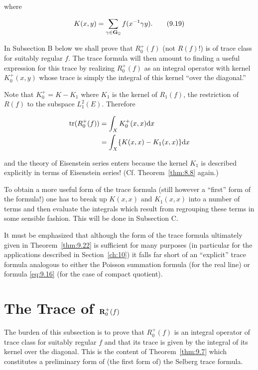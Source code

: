 where

\begin{equation}\label{eq:9.19}
K(x, y) = \sum_{\gamma \in \mathbf{G}_{\mathbb{Q}}} f(x^{-1}\gamma y).\tag{9.19}
\end{equation}

In Subsection B below we shall prove that $R_0^{+}(f)$ (not $R(f)!$) is of trace class for suitably regular $f$. The trace formula will then amount to finding a useful expression for this trace by realizing $R_0^{+}(f)$ as an integral operator with kernel $K_0^{+}(x,y)$ whose trace is simply the integral of this kernel ``over the diagonal.''

Note that $K_0^{+} = K - K_1$ where $K_1$ is the kernel of $R_1(f)$, the restriction of $R(f)$ to the subspace $L_1^2(E)$. Therefore

\[
\begin{aligned}
\operatorname{tr}(R_0^{+}(f)) &= \int_X K_0^{+}(x, x)\mathrm{d} x\\
&= \int_X \{K(x, x) - K_1(x, x)\}\mathrm{d} x
\end{aligned}
\]

and the theory of Eisenstein series enters because the kernel $K_1$ is described explicitly in terms of Eisenstein series! (Cf. Theorem~\ref{thm:8.8} again.)

To obtain a more useful form of the trace formula (still however a ``first'' form of the formula!) one has to break up $K(x,x)$ and $K_1(x,x)$ into a number of terms and then evaluate the integrals which result from regrouping these terms in some sensible fashion. This will be done in Subsection C.

It must be emphasized that although the form of the trace formula ultimately given in Theorem~\ref{thm:9.22} is sufficient for many purposes (in particular for the applications described in Section~\ref{ch:10}) it falls far short of an ``explicit'' trace formula analogous to either the Poisson summation formula (for the real line) or formula \eqref{eq:9.16} (for the case of compact quotient).

\section{The Trace of \texorpdfstring{$\mathbf{R}_0^{+}(f)$}{R0+(f)}}\label{sec:9b}

The burden of this subsection is to prove that $R_0^{+}(f)$ is an integral operator of trace class for suitably regular $f$ and that its trace is given by the integral of its kernel over the diagonal. This is the content of Theorem~\ref{thm:9.7} which constitutes a preliminary form of (the first form of) the Selberg trace formula.

